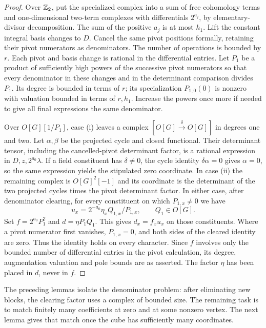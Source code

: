\begin{proof}
Over $\mathbb Z_2$, put the specialized complex into a sum of free
cohomology terms and one-dimensional two-term complexes with
differentials $2^{a_j}$, by elementary-divisor decomposition. The sum
of the positive $a_j$ is at most $h_1$. Lift the constant integral
basis changes to $D$. Cancel the same pivot positions formally, retaining
their pivot numerators as denominators. The number of operations is bounded
by $r$. Each pivot and basis change is rational in the differential
entries. Let $P_1$ be a product of sufficiently high powers of the
successive pivot numerators so that every denominator in these changes
and in the determinant comparison divides $P_1$. Its degree is bounded
in terms of $r$; its specialization $P_{1,0}(0)$ is nonzero with
valuation bounded in terms of $r,h_1$. Increase the powers once more
if needed to give all final expressions the same denominator.

Over $O[G][1/P_1]$, case \textup{(i)} leaves a complex
$[O[G]\xrightarrow{\delta}O[G]]$ in degrees one and two. Let
$\alpha,\beta$ be the projected cycle and closed functional. Their
determinant tensor, including the cancelled-pivot determinant factor,
is a rational expression in $D,z,2^{a_0}\lambda$. If a field
constituent has $\delta\ne0$, the cycle identity
$\delta\alpha=0$ gives $\alpha=0$, so the same expression yields
the stipulated zero coordinate. In case \textup{(ii)} the remaining
complex is $O[G]^2[-1]$ and its coordinate is the determinant of the
two projected cycles times the pivot determinant factor. In either
case, after denominator clearing, for every constituent on which
$P_{1,x}\ne0$ we have
\[
 u_x=2^{-a_0}\eta_x Q_{1,x}/P_{1,x},\qquad Q_1\in O[G].
\]
Set $f=2^{a_0}P_1^2$ and $d=\eta P_1Q_1$. This gives $d_x=f_xu_x$
on those constituents. Where a pivot numerator first vanishes,
$P_{1,x}=0$, and both sides of the cleared identity are zero. Thus the
identity holds on every character. Since $f$ involves only the
bounded number of differential entries in the pivot calculation,
its degree, augmentation valuation and pole bounds are as asserted.
The factor $\eta$ has been placed in $d$, never in $f$.
\end{proof}

The preceding lemmas isolate the denominator problem: after eliminating
new blocks, the clearing factor uses a complex of bounded size.
The remaining task is to match finitely many coefficients at zero and
at some nonzero vertex. The next lemma gives that match once the cube
has sufficiently many coordinates.

